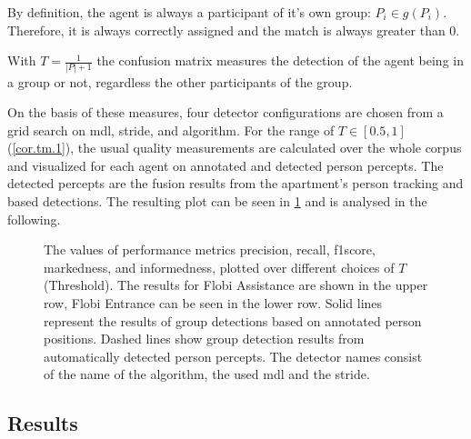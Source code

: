 By definition, the agent is always a participant of it's own group: \(P_i \in g(P_i)\).
Therefore, it is always correctly assigned and the match is always greater than 0.
\begin{corollary}
    \label{cor.tm.2}
    With \(T=\frac{1}{|P|+1}\) the \gls{confusion matrix} measures the detection of the agent being in a group or not, regardless the other participants of the group.
\end{corollary}
On the basis of these measures, four detector configurations are chosen from a grid search on \gls{mdl}, \gls{stride}, and algorithm.
For the range of \(T \in [0.5,1]\) (\cref{cor.tm.1}), the usual quality measurements are calculated over the whole corpus and visualized for each agent on annotated and detected person percepts.
The detected percepts are the fusion results from the \gls{apartment}'s person tracking and  based detections.
The resulting plot can be seen in \cref{fig:ffm-ffm} and is analysed in the following.
\begin{figure}[tbhp]
    \centering
    \small
    
    \caption[F-Formation detection quality.]{\label{fig:ffm-ffm}
    The values of performance metrics \gls{precision}, \gls{recall}, \gls{f1score}, \gls{markedness}, and \gls{informedness}, plotted over different choices of \(T\) (Threshold).
    The results for \gls{Flobi Assistance} are shown in the upper row, \gls{Flobi Entrance} can be seen in the lower row.
    Solid lines represent the results of group detections based on annotated person positions.
    Dashed lines show group detection results from automatically detected person percepts.
    The detector names consist of the name of the algorithm, the used \gls{mdl} and the \gls{stride}.
    }
\end{figure}

\subsection{Results}

